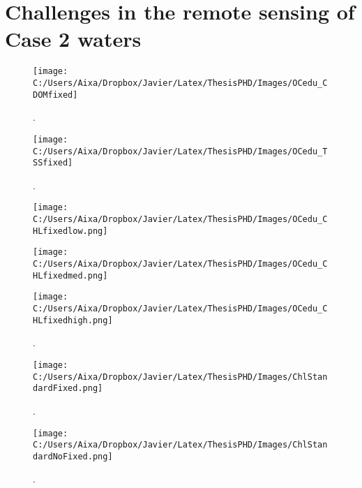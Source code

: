 \section{Challenges in the remote sensing of Case 2 waters}

\begin{figure}[htb]
\centering
      \texttt{[image: C:/Users/Aixa/Dropbox/Javier/Latex/ThesisPHD/Images/OCedu\_CDOMfixed]}
      \caption{.\label{fig:CDOMfixed} } 
\end{figure}

\begin{figure}[htb]
\centering
      \texttt{[image: C:/Users/Aixa/Dropbox/Javier/Latex/ThesisPHD/Images/OCedu\_TSSfixed]}
      \caption{.\label{fig:TSSfixed} } 
\end{figure}

\begin{figure}[htb]
  \begin{minipage}[c]{0.48\linewidth}
    \centering
      \texttt{[image: C:/Users/Aixa/Dropbox/Javier/Latex/ThesisPHD/Images/OCedu\_CHLfixedlow.png]}
    \end{minipage}
   \hfill   
   \begin{minipage}[c]{0.48\linewidth}
    \centering
      \texttt{[image: C:/Users/Aixa/Dropbox/Javier/Latex/ThesisPHD/Images/OCedu\_CHLfixedmed.png]}
  \end{minipage}    
  \begin{minipage}[c]{1.0\linewidth}
    \centering
      \texttt{[image: C:/Users/Aixa/Dropbox/Javier/Latex/ThesisPHD/Images/OCedu\_CHLfixedhigh.png]}
  \end{minipage}    
      \caption{.\label{fig:OCedu_CHLfixed} }
\end{figure}

\begin{figure}[htb]
\centering
      \texttt{[image: C:/Users/Aixa/Dropbox/Javier/Latex/ThesisPHD/Images/ChlStandardFixed.png]}
      \caption{.\label{fig:ChlStandardFixed} } 
\end{figure}

\begin{figure}[htb]
\centering
      \texttt{[image: C:/Users/Aixa/Dropbox/Javier/Latex/ThesisPHD/Images/ChlStandardNoFixed.png]}
      \caption{.\label{fig:ChlStandardNoFixed} } 
\end{figure}

